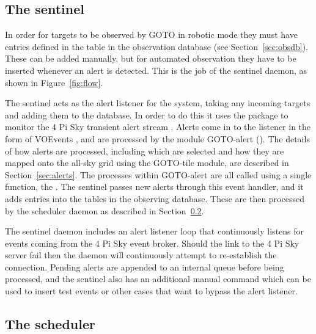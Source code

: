 \begin{colsection}

\subsection{The sentinel}
\label{sec:sentinel}
\begin{colsection}

In order for targets to be observed by GOTO in robotic mode they must have entries defined in the  table in the observation database (see Section~\ref{sec:obsdb}). These can be added manually, but for automated observation they have to be inserted whenever an alert is detected. This is the job of the sentinel daemon, as shown in Figure~\ref{fig:flow}.

The sentinel acts as the alert listener for the system, taking any incoming targets and adding them to the database. In order to do this it uses the   package to monitor the 4 Pi Sky transient alert stream \citep{4pisky}. Alerts come in to the listener in the form of VOEvents \citep{voevent}, and are processed by the  module GOTO-alert (). The details of how alerts are processed, including which are selected and how they are mapped onto the all-sky grid using the GOTO-tile module, are described in Section~\ref{sec:alerts}. The processes within GOTO-alert are all called using a single function, the . The sentinel passes new alerts through this event handler, and it adds entries into the tables in the observing database. These are then processed by the scheduler daemon as described in Section~\ref{sec:scheduler}.

The sentinel daemon includes an alert listener loop that continuously listens for events coming from the 4 Pi Sky event broker. Should the link to the 4 Pi Sky server fail then the daemon will continuously attempt to re-establish the connection. Pending alerts are appended to an internal queue before being processed, and the sentinel also has an additional manual  command which can be used to insert test events or other cases that want to bypass the alert listener.

\end{colsection}


\subsection{The scheduler}
\label{sec:scheduler}
\begin{colsection}


\end{colsection}
\end{colsection}
